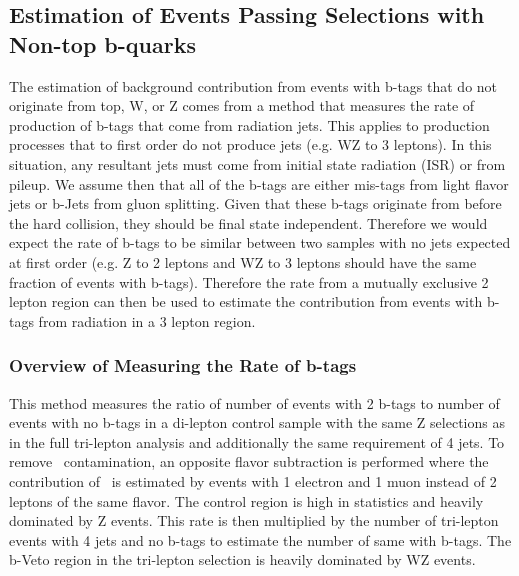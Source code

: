 	\subsection{Estimation of Events Passing Selections with Non-top b-quarks}
	\label{sec:brate_estimation}
	The estimation of background contribution from events with b-tags that do not originate from top, W, or Z  comes from a method that measures the rate of production of b-tags that come from radiation jets. This applies to production processes that to first order do not produce jets (e.g. WZ to 3 leptons). In this situation, any resultant jets must come from initial state radiation (ISR) or from pileup. We assume then that all of the b-tags are either mis-tags from light flavor jets or b-Jets from gluon splitting. Given that these b-tags originate from before the hard collision, they should be final state independent. Therefore we would expect the rate of b-tags to be similar between two samples with no jets expected at first order (e.g. Z to 2 leptons and WZ to 3 leptons should have the same fraction of events with b-tags). Therefore the rate from a mutually exclusive 2 lepton region can then be used to estimate the contribution from events with b-tags from radiation in a 3 lepton region.
	
		
        		\subsubsection{Overview of Measuring the Rate of b-tags}
		This method measures the ratio of number of events with 2 b-tags to number of events with no b-tags in a di-lepton control sample with the same Z selections as in the full tri-lepton analysis and additionally the same requirement of 4 jets. To remove \ttbar \ contamination, an opposite flavor subtraction is performed where the contribution of \ttbar \ is estimated by events with 1 electron and 1 muon instead of 2 leptons of the same flavor. The control region is high in statistics and heavily dominated by Z events.  This rate is then multiplied by the number of tri-lepton events with 4 jets and no b-tags to estimate the number of same with b-tags. The b-Veto region in the tri-lepton selection is heavily dominated by WZ events.\\

